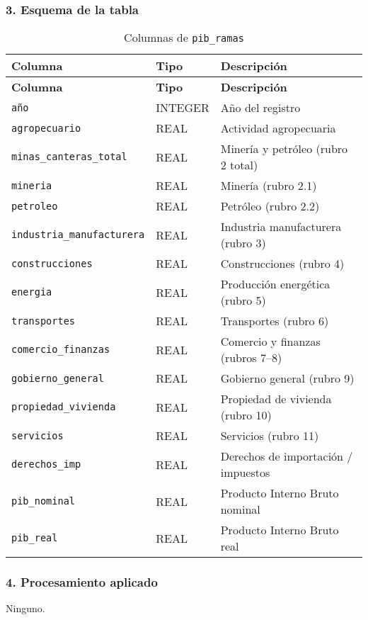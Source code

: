 \documentclass[12pt,a4paper]{article}
\begin{document}
\subsubsection*{3. Esquema de la tabla}
\begin{longtable}{@{}lll@{}}
\caption{Columnas de \texttt{pib\_ramas}}\\
\toprule
\textbf{Columna} & \textbf{Tipo} & \textbf{Descripción} \\
\midrule
\endfirsthead
\toprule
\textbf{Columna} & \textbf{Tipo} & \textbf{Descripción} \\
\midrule
\endhead
\bottomrule
\endfoot
\texttt{año}                      & INTEGER & Año del registro \\
\texttt{agropecuario}             & REAL    & Actividad agropecuaria \\
\texttt{minas\_canteras\_total}   & REAL    & Minería y petróleo (rubro 2 total) \\
\texttt{mineria}                  & REAL    & Minería (rubro 2.1) \\
\texttt{petroleo}                 & REAL    & Petróleo (rubro 2.2) \\
\texttt{industria\_manufacturera}  & REAL    & Industria manufacturera (rubro 3) \\
\texttt{construcciones}           & REAL    & Construcciones (rubro 4) \\
\texttt{energia}                  & REAL    & Producción energética (rubro 5) \\
\texttt{transportes}              & REAL    & Transportes (rubro 6) \\
\texttt{comercio\_finanzas}       & REAL    & Comercio y finanzas (rubros 7–8) \\
\texttt{gobierno\_general}        & REAL    & Gobierno general (rubro 9) \\
\texttt{propiedad\_vivienda}      & REAL    & Propiedad de vivienda (rubro 10) \\
\texttt{servicios}                & REAL    & Servicios (rubro 11) \\
\texttt{derechos\_imp}            & REAL    & Derechos de importación / impuestos \\
\texttt{pib\_nominal}             & REAL    & Producto Interno Bruto nominal \\
\texttt{pib\_real}                & REAL    & Producto Interno Bruto real \\
\end{longtable}

\subsubsection*{4. Procesamiento aplicado}
Ninguno.
\end{document}
